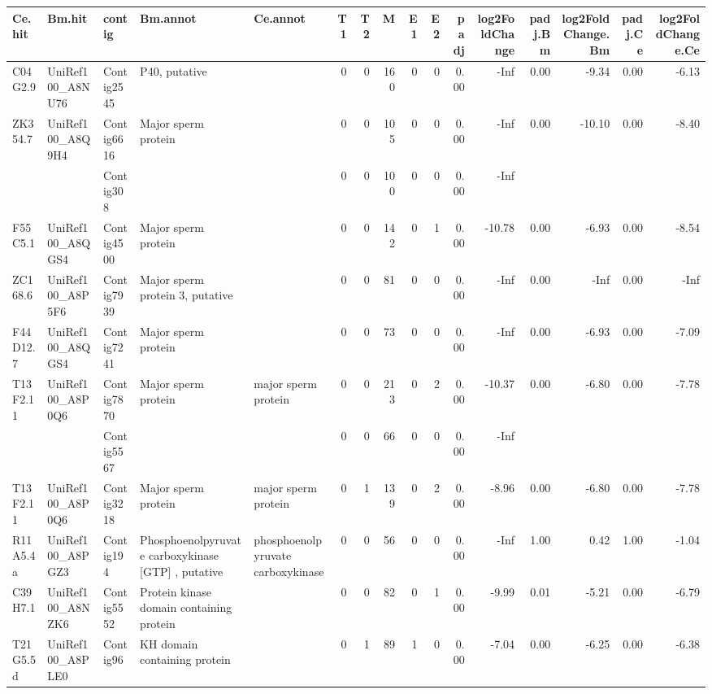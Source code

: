 \documentclass[10pt]{bmc_article}
\newenvironment{bmcformat}{\begin{raggedright}\baselineskip20pt\sloppy\setboolean{publ}{false}}{\end{raggedright}\baselineskip20pt\sloppy}
\begin{document}
\begin{bmcformat}
\tiny
\begin{sidewaystable}[ht]
\begin{center}
\begin{tabular}{lllp{2cm}p{2cm}rrrrrrrrrrr}
  \hline
Ce.hit & Bm.hit & contig & Bm.annot & Ce.annot & T1 & T2 & M & E1 & E2 & padj & log2FoldChange & padj.Bm & log2FoldChange.Bm & padj.Ce & log2FoldChange.Ce \\ 
  \hline
C04G2.9 & UniRef100\_A8NU76 & Contig2545 & P40, putative &  &   0 &   0 & 160 &   0 &   0 & 0.00 & -Inf & 0.00 & -9.34 & 0.00 & -6.13 \\ 
  ZK354.7 & UniRef100\_A8Q9H4 & Contig6616 & Major sperm protein &  &   0 &   0 & 105 &   0 &   0 & 0.00 & -Inf & 0.00 & -10.10 & 0.00 & -8.40 \\ 
   &  & Contig308 &  &  &   0 &   0 & 100 &   0 &   0 & 0.00 & -Inf &  &  &  &  \\ 
  F55C5.1 & UniRef100\_A8QGS4 & Contig4500 & Major sperm protein &  &   0 &   0 & 142 &   0 &   1 & 0.00 & -10.78 & 0.00 & -6.93 & 0.00 & -8.54 \\ 
  ZC168.6 & UniRef100\_A8P5F6 & Contig7939 & Major sperm protein 3, putative &  &   0 &   0 &  81 &   0 &   0 & 0.00 & -Inf & 0.00 & -Inf & 0.00 & -Inf \\ 
  F44D12.7 & UniRef100\_A8QGS4 & Contig7241 & Major sperm protein &  &   0 &   0 &  73 &   0 &   0 & 0.00 & -Inf & 0.00 & -6.93 & 0.00 & -7.09 \\ 
  T13F2.11 & UniRef100\_A8P0Q6 & Contig7870 & Major sperm protein & major sperm protein &   0 &   0 & 213 &   0 &   2 & 0.00 & -10.37 & 0.00 & -6.80 & 0.00 & -7.78 \\ 
   &  & Contig5567 &  &  &   0 &   0 &  66 &   0 &   0 & 0.00 & -Inf &  &  &  &  \\ 
  T13F2.11 & UniRef100\_A8P0Q6 & Contig3218 & Major sperm protein & major sperm protein &   0 &   1 & 139 &   0 &   2 & 0.00 & -8.96 & 0.00 & -6.80 & 0.00 & -7.78 \\ 
  R11A5.4a & UniRef100\_A8PGZ3 & Contig194 & Phosphoenolpyruvate carboxykinase [GTP] , putative & phosphoenolpyruvate carboxykinase &   0 &   0 &  56 &   0 &   0 & 0.00 & -Inf & 1.00 & 0.42 & 1.00 & -1.04 \\ 
  C39H7.1 & UniRef100\_A8NZK6 & Contig5552 & Protein kinase domain containing protein &  &   0 &   0 &  82 &   0 &   1 & 0.00 & -9.99 & 0.01 & -5.21 & 0.00 & -6.79 \\ 
  T21G5.5d & UniRef100\_A8PLE0 & Contig96 & KH domain containing protein &  &   0 &   1 &  89 &   1 &   0 & 0.00 & -7.04 & 0.00 & -6.25 & 0.00 & -6.38 \\ 

\end{tabular}
\end{center}
\end{sidewaystable}
\end{bmcformat}
\end{document}
